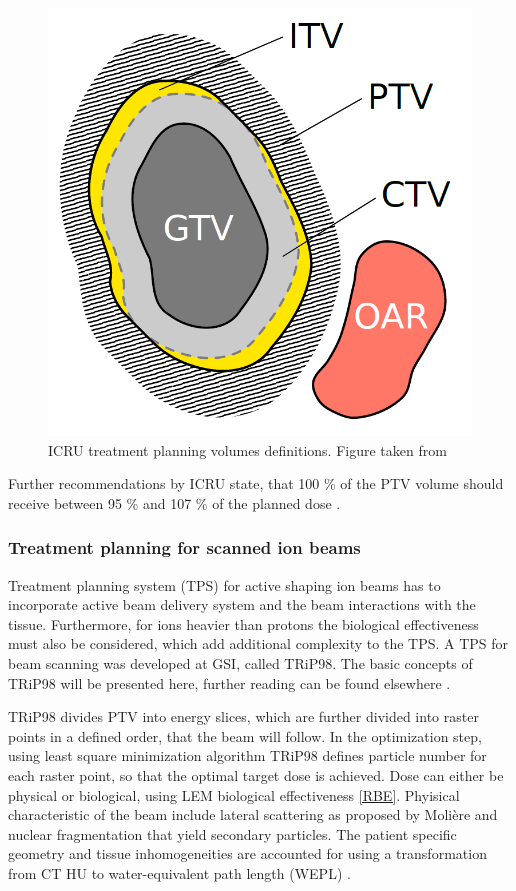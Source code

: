 \documentclass[type=dr, dr=rernat, accentcolor=tud7b,colorbacktitle, bigchapter, openright, twoside, 12pt ]{tudthesis}
\begin{document}
\begin{figure}[H]
\begin{center}
\includegraphics[scale=0.3]{./Images/volumes.png}
\caption{ICRU treatment planning volumes definitions. Figure taken from \cite{Richter2012}}
\end{center}
\end{figure}

Further recommendations by ICRU state, that 100 \% of the PTV volume should receive between 95 \% and 107 \% of the planned dose \cite{ICRU50}.


\subsubsection{Treatment planning for scanned ion beams}

Treatment planning system (TPS) for active shaping ion beams has to incorporate active beam delivery system and the beam interactions with the tissue. Furthermore, for ions heavier than protons
the biological effectiveness must also be considered, which add additional complexity to the TPS. A TPS for beam scanning was developed at GSI, called TRiP98. The basic concepts of TRiP98 will be
presented here, further reading can be found elsewhere \cite{Kraemer2000,Kraemer2000a}.

TRiP98 divides PTV into energy slices, which are further divided into raster points in a defined order, that the beam will follow. In the optimization step, using least square minimization
algorithm TRiP98 defines particle number for each raster point, so that the optimal target dose is achieved. Dose can either be physical or biological, using LEM biological effectiveness \ref{RBE}.
Phyisical characteristic of the beam include lateral scattering as proposed by Moli\`ere \cite{Moliere1948} and nuclear fragmentation that yield secondary particles. The patient specific
geometry and tissue inhomogeneities are accounted for using a transformation from CT HU to water-equivalent path length (WEPL) \cite{Geiss1999,Jaekel2001,Rietzel2007}.
\end{document}
